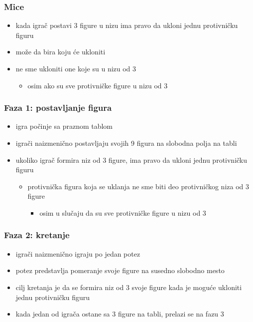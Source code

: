 \documentclass[compress,aspectratio=169]{beamer}
\begin{document}
\begin{frame}[fragile]
  \frametitle{Mice}
  \begin{itemize}
    \item kada igrač postavi 3 figure u nizu ima pravo da ukloni jednu protivničku figuru
    \item može da bira koju će ukloniti
    \item ne sme ukloniti one koje su u nizu od 3
    \begin{itemize}
      \item osim ako su sve protivničke figure u nizu od 3
    \end{itemize}
  \end{itemize}
\end{frame}

\begin{frame}[fragile]
  \frametitle{Faza 1: postavljanje figura}
  \begin{itemize}
    \item igra počinje sa praznom tablom
    \item igrači naizmenično postavljaju svojih 9 figura na slobodna polja na tabli
    \item ukoliko igrač formira niz od 3 figure, ima pravo da ukloni jednu protivničku figuru
    \begin{itemize}
      \item protivnička figura koja se uklanja ne sme biti deo protivničkog niza od 3 figure
      \begin{itemize}
        \item osim u slučaju da su sve protivničke figure u nizu od 3
      \end{itemize}
    \end{itemize}
  \end{itemize}
\end{frame}

\begin{frame}[fragile]
  \frametitle{Faza 2: kretanje}
  \begin{itemize}
    \item igrači naizmenično igraju po jedan potez
    \item potez predstavlja pomeranje svoje figure na susedno slobodno mesto
    \item cilj kretanja je da se formira niz od 3 svoje figure kada je moguće ukloniti jednu protivničku figuru
    \item kada jedan od igrača ostane sa 3 figure na tabli, prelazi se na fazu 3
  \end{itemize}
\end{frame}
\end{document}
